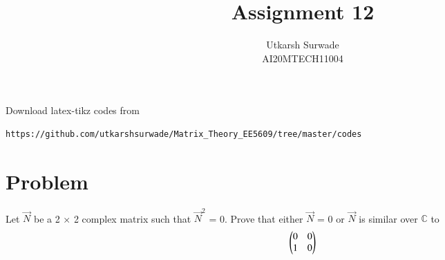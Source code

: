 \documentclass[journal,12pt]{IEEEtran}
\begin{document}
     \def\rightbox#1{\makebox[0in][r]{#1}}
     \def\centbox#1{\makebox[0in]{#1}}
     \def\topbox#1{\raisebox{-\baselineskip}[0in][0in]{#1}}
     \def\midbox#1{\raisebox{-0.5\baselineskip}[0in][0in]{#1}}
\vspace{3cm}
\title{Assignment 12}
\author{Utkarsh Surwade\\AI20MTECH11004}
\maketitle
\bigskip
\renewcommand{\thefigure}{\theenumi}
\renewcommand{\thetable}{\theenumi}
Download latex-tikz codes from 
%
\begin{lstlisting}
https://github.com/utkarshsurwade/Matrix_Theory_EE5609/tree/master/codes
\end{lstlisting}
%
 
\section{\textbf{Problem}}
Let $\vec{N}$ be a 2 × 2 complex matrix such that $\vec{N}^2$ = 0. Prove that either $\vec{N}$ = 0 or $\vec{N}$ is similar over $\mathbb{C}$ to\\
\begin{align}
\begin{pmatrix}0&0\\1&0\end{pmatrix}
\end{align}
\end{document}
